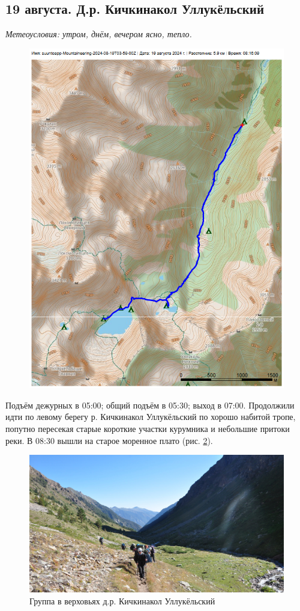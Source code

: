 \subsection{19 августа. Д.р. Кичкинакол Уллукёльский}
\textit{Метеоусловия: утром, днём, вечером ясно, тепло.}

\begin{figure}[h!]
	\centering
	\includegraphics[angle=0, width=0.7\linewidth]{../pics/mini_maps/19}
	\label{fig:mini_19}
\end{figure}

Подъём дежурных в 05:00; общий подъём в 05:30; выход в 07:00.
Продолжили идти по левому берегу р. Кичкинакол Уллукёльский по хорошо набитой тропе, попутно  пересекая старые короткие участки курумника и небольшие притоки реки. В 08:30 вышли на старое моренное плато (рис. \ref{fig:DSC_0692}).

\begin{figure}[h!]
	\centering
	\includegraphics[width=0.7\linewidth]{../pics/DSC_0692}
	\caption{Группа в верховьях д.р. Кичкинакол Уллукёльский}
	\label{fig:DSC_0692}
\end{figure}

